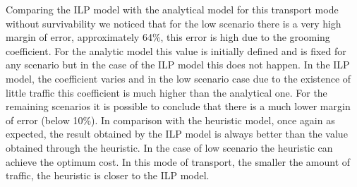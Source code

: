 \vspace{13pt}
Comparing the ILP model with the analytical model for this transport mode without survivability we noticed that for the low scenario there is a very high margin of error, approximately 64\%, this error is high due to the grooming coefficient. For the analytic model this value is initially defined and is fixed for any scenario but in the case of the ILP model this does not happen. In the ILP model, the coefficient varies and in the low scenario case due to the existence of little traffic this coefficient is much higher than the analytical one. For the remaining scenarios it is possible to conclude that there is a much lower margin of error (below 10\%). In comparison with the heuristic model, once again as expected, the result obtained by the ILP model is always better than the value obtained through the heuristic. In the case of low scenario the heuristic can achieve the optimum cost. In this mode of transport, the smaller the amount of traffic, the heuristic is closer to the ILP model.
